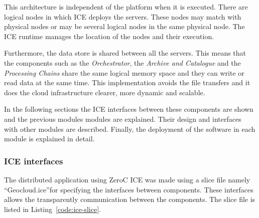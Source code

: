 This architecture is independent of the platform when it is executed. There are
logical nodes in which ICE deploys the servers. These nodes may match with
physical nodes or may be several logical nodes in the same physical node. The
ICE runtime manages the location of the nodes and their execution.

Furthermore, the data store is shared between all the servers. This means that the
components such as the \emph{Orchestrator}, the \emph{Archive and Catalogue} and the
\emph{Processing Chains} share the same logical memory space and they can write or read data
at the same time. This implementation avoids the file transfers and it does the
cloud infrastructure clearer, more dynamic and scalable.

In the following sections the  ICE interfaces between these components are
shown and the previous modules modules are explained. Their design and
interfaces with other modules are described. Finally, the
deployment of the software in each module is explained in detail.

\subsubsection{ICE interfaces}

The distributed application using ZeroC ICE was made using a slice file namely
``Geocloud.ice''for
specifying the  interfaces between components. These interfaces allows the transparently
communication between the components. The slice file is listed in Listing~\ref{code:ice-slice}.


